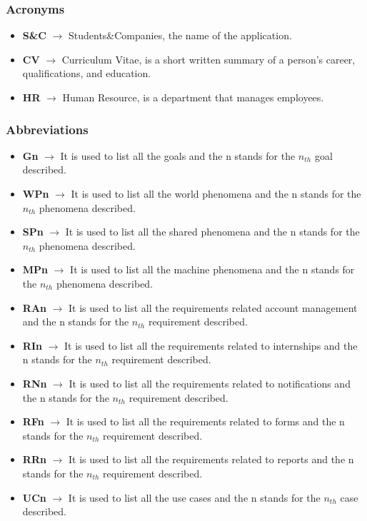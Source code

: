 \documentclass[11pt,twoside]{article}
\begin{document}
		\subsubsection{Acronyms}
\begin{itemize}
\item \textbf{S\&C} $\rightarrow$ Students\&Companies, the name of the application.
\item \textbf{CV} $\rightarrow$ Curriculum Vitae, is a short written summary of a person's career, qualifications, and education.
\item \textbf{HR} $\rightarrow$ Human Resource, is a department that manages employees.
\end{itemize}
		\subsubsection{Abbreviations}
\begin{itemize}
\item \textbf{Gn} $\rightarrow$ It is used to list all the goals and the n stands for the $n_{th}$ goal described.
\item \textbf{WPn} $\rightarrow$ It is used to list all the world phenomena and the n stands for the $n_{th}$ phenomena described.
\item \textbf{SPn} $\rightarrow$ It is used to list all the shared phenomena and the n stands for the $n_{th}$ phenomena described.
\item \textbf{MPn} $\rightarrow$ It is used to list all the machine phenomena and the n stands for the $n_{th}$ phenomena described.
\item \textbf{RAn} $\rightarrow$ It is used to list all the requirements related account management and the n stands for the $n_{th}$ requirement described.
\item \textbf{RIn} $\rightarrow$ It is used to list all the requirements related to internships and the n stands for the $n_{th}$ requirement described.
\item \textbf{RNn} $\rightarrow$ It is used to list all the requirements related to notifications and the n stands for the $n_{th}$ requirement described.
\item \textbf{RFn} $\rightarrow$ It is used to list all the requirements related to forms and the n stands for the $n_{th}$ requirement described.
\item \textbf{RRn} $\rightarrow$ It is used to list all the requirements related to reports and the n stands for the $n_{th}$ requirement described.
\item \textbf{UCn} $\rightarrow$ It is used to list all the use cases and the n stands for the $n_{th}$ case described.
\end{itemize}
		
\end{document}
